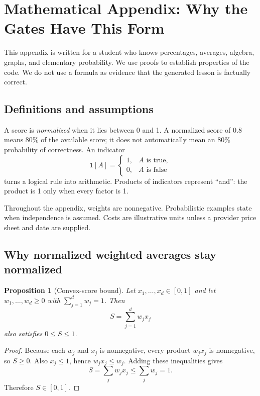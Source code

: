 \documentclass[11pt]{article}
\newcommand{\ind}[1]{\mathbf{1}\!\left[#1\right]}
\theoremstyle{plain}
\newtheorem{proposition}{Proposition}[section]
\theoremstyle{definition}
\begin{document}
\appendix
\section{Mathematical Appendix: Why the Gates Have This Form}
\label{app:math}

This appendix is written for a student who knows percentages, averages, algebra, graphs, and elementary probability. We use proofs to establish properties of the code. We do not use a formula as evidence that the generated lesson is factually correct.

\subsection{Definitions and assumptions}

A score is \emph{normalized} when it lies between 0 and 1. A normalized score of 0.8 means 80\% of the available score; it does not automatically mean an 80\% probability of correctness. An indicator
\[
\ind{A}=\begin{cases}1,&A\text{ is true},\\0,&A\text{ is false}\end{cases}
\]
turns a logical rule into arithmetic. Products of indicators represent ``and'': the product is 1 only when every factor is 1.

Throughout the appendix, weights are nonnegative. Probabilistic examples state when independence is assumed. Costs are illustrative units unless a provider price sheet and date are supplied.

\subsection{Why normalized weighted averages stay normalized}

\begin{proposition}[Convex-score bound]
\label{prop:convex}
Let $x_1,\ldots,x_d\in[0,1]$ and let $w_1,\ldots,w_d\ge0$ with $\sum_{j=1}^d w_j=1$. Then
\[
S=\sum_{j=1}^d w_jx_j
\]
also satisfies $0\le S\le1$.
\end{proposition}

\begin{proof}
Because each $w_j$ and $x_j$ is nonnegative, every product $w_jx_j$ is nonnegative, so $S\ge0$. Also $x_j\le1$, hence $w_jx_j\le w_j$. Adding these inequalities gives
\[
S=\sum_jw_jx_j\le\sum_jw_j=1.
\]
Therefore $S\in[0,1]$.
\end{proof}
\end{document}
